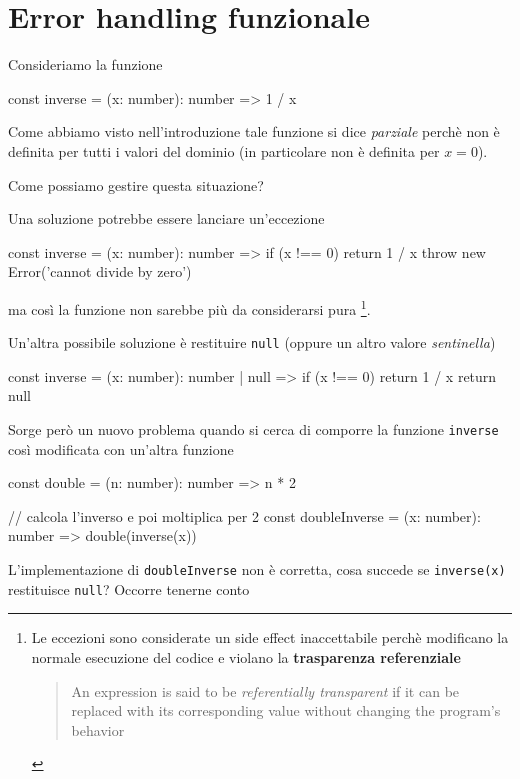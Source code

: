 \documentclass[12pt]{article}
\theoremstyle{definition}
\newenvironment{code}
  {\vspace{0.5cm} \VerbatimEnvironment\begin{typescriptcode}}
  {\end{typescriptcode} \vspace{0.2cm}}
\begin{document}
\newpage
\section{Error handling funzionale}

Consideriamo la funzione

\begin{code}
const inverse = (x: number): number => 1 / x
\end{code}

Come abbiamo visto nell'introduzione tale funzione si dice \emph{parziale} perchè non è definita per tutti i valori del dominio
(in particolare non è definita per $x = 0$).

Come possiamo gestire questa situazione?

Una soluzione potrebbe essere lanciare un'eccezione

\begin{code}
const inverse = (x: number): number => {
  if (x !== 0) return 1 / x
  throw new Error('cannot divide by zero')
}
\end{code}

ma così la funzione non sarebbe più da considerarsi pura
\footnote{Le eccezioni sono considerate un side effect inaccettabile perchè modificano la normale esecuzione del codice
e violano la \textbf{trasparenza referenziale}

\begin{quote}
An expression is said to be \emph{referentially transparent} if it can be replaced with its corresponding value without changing the program's behavior
\end{quote}
}.

Un'altra possibile soluzione è restituire \texttt{null} (oppure un altro valore \emph{sentinella})

\begin{code}
const inverse = (x: number): number | null => {
  if (x !== 0) return 1 / x
  return null
}
\end{code}

Sorge però un nuovo problema quando si cerca di comporre la funzione \texttt{inverse} così modificata con un'altra funzione

\begin{code}
const double = (n: number): number => n * 2

// calcola l'inverso e poi moltiplica per 2
const doubleInverse = (x: number): number => double(inverse(x))
\end{code}

L'implementazione di \texttt{doubleInverse} non è corretta, cosa succede se \texttt{inverse(x)} restituisce \texttt{null}?
Occorre tenerne conto
\end{document}
